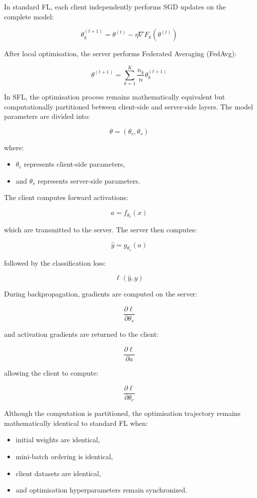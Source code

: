 In standard FL, each client independently performs SGD updates on the complete model:

\[
\theta_k^{(t+1)}
=
\theta^{(t)}
-
\eta \nabla F_k(\theta^{(t)})
\]

After local optimisation, the server performs Federated Averaging (FedAvg):

\[
\theta^{(t+1)}
=
\sum_{k=1}^{K}
\frac{n_k}{n}
\theta_k^{(t+1)}
\]

In SFL, the optimisation process remains mathematically equivalent but computationally partitioned between client-side and server-side layers. The model parameters are divided into:

\[
\theta
=
(\theta_c, \theta_s)
\]

where:
\begin{itemize}
    \item $\theta_c$ represents client-side parameters,
    \item and $\theta_s$ represents server-side parameters.
\end{itemize}

The client computes forward activations:

\[
a = f_{\theta_c}(x)
\]

which are transmitted to the server. The server then computes:

\[
\hat{y}
=
g_{\theta_s}(a)
\]

followed by the classification loss:

\[
\ell(\hat{y}, y)
\]

During backpropagation, gradients are computed on the server:

\[
\frac{\partial \ell}{\partial \theta_s}
\]

and activation gradients are returned to the client:

\[
\frac{\partial \ell}{\partial a}
\]

allowing the client to compute:

\[
\frac{\partial \ell}{\partial \theta_c}
\]

Although the computation is partitioned, the optimisation trajectory remains mathematically identical to standard FL when:
\begin{itemize}
    \item initial weights are identical,
    \item mini-batch ordering is identical,
    \item client datasets are identical,
    \item and optimisation hyperparameters remain synchronized.
\end{itemize}

